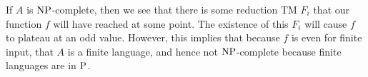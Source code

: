 \begin{note}
  If $A$ is $\mathrm{NP}$-complete, then we see that there is some reduction TM $F_i$
  that our function $f$ will have reached at some point.
  The existence of this $F_i$ will cause $f$ to plateau at an odd value.
  However, this implies that because $f$ is even for finite input, that $A$
  is a finite language, and hence not $\mathrm{NP}$-complete because finite languages
  are in $\mathrm{P}$.

\end{note}

